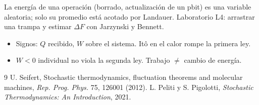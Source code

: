 \documentclass[11pt,a4paper]{article}
\begin{document}
\begin{aplicacion}
La energía de una operación (borrado, actualización de un pbit) es una variable aleatoria; solo su promedio está acotado por Landauer.
Laboratorio L4: arrastrar una trampa y estimar $\Delta F$ con Jarzynski y Bennett.
\end{aplicacion}

\begin{error}
\begin{itemize}[nosep]
\item Signos: $Q$ recibido, $W$ sobre el sistema. \quad Itô en el calor rompe la primera ley.
\item $W<0$ individual no viola la segunda ley. \quad Trabajo $\neq$ cambio de energía.
\end{itemize}
\end{error}

\begin{thebibliography}{9}\small
{} U. Seifert, Stochastic thermodynamics, fluctuation theorems and molecular machines, \emph{Rep. Prog. Phys.} 75, 126001 (2012).
 L. Peliti y S. Pigolotti, \emph{Stochastic Thermodynamics: An Introduction}, 2021.
\end{thebibliography}
\end{document}
